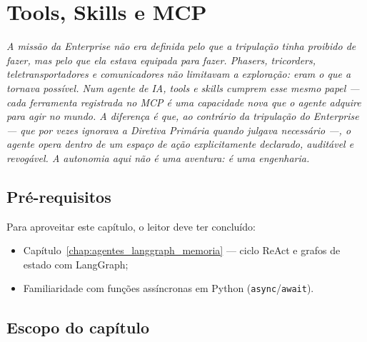 \chapter{Tools, Skills e MCP}
\label{chap:tools_skills_mcp}

{\small\itshape\color{AccentGray}
A miss\~ao da \textit{Enterprise} n\~ao era definida pelo que a tripula\c{c}\~ao tinha \emph{proibido} de fazer, mas pelo que ela estava \emph{equipada} para fazer. Phasers, tricorders, teletransportadores e comunicadores n\~ao limitavam a explora\c{c}\~ao: eram o que a tornava poss\'ivel. Num agente de IA, \textit{tools} e \textit{skills} cumprem esse mesmo papel --- cada ferramenta registrada no MCP \'e uma capacidade nova que o agente adquire para agir no mundo. A diferen\c{c}a \'e que, ao contr\'ario da tripula\c{c}\~ao do \textit{Enterprise} --- que por vezes ignorava a Diretiva Prim\'aria quando julgava necess\'ario ---, o agente opera dentro de um espa\c{c}o de a\c{c}\~ao explicitamente declarado, audit\'avel e revog\'avel. A autonomia aqui n\~ao \'e uma aventura: \'e uma engenharia.\par}
\vspace{0.6em}
\section{Pr\'e-requisitos}

Para aproveitar este cap\'itulo, o leitor deve ter conclu\'ido:

\begin{itemize}[leftmargin=*]
  \item Cap\'itulo~\ref{chap:agentes_langgraph_memoria} --- ciclo ReAct
        e grafos de estado com LangGraph;
  \item Familiaridade com fun\c{c}\~oes ass\'incronas em Python
        (\texttt{async}/\texttt{await}).
\end{itemize}

\section{Escopo do cap\'itulo}

